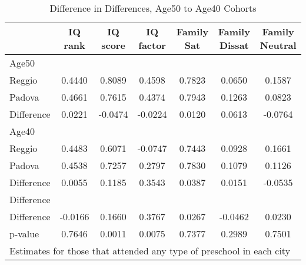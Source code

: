 \begin{table}[htbp]\centering
\caption{Difference in Differences, Age50 to Age40 Cohorts}
\begin{tabular}{l*{6}{c}}
\hline\hline
            &     IQ rank&    IQ score&   IQ factor&  Family Sat&Family Dissat&Family Neutral\\
\hline
Age50       &            &            &            &            &            &            \\
Reggio      &      0.4440&      0.8089&      0.4598&      0.7823&      0.0650&      0.1587\\
Padova      &      0.4661&      0.7615&      0.4374&      0.7943&      0.1263&      0.0823\\
Difference  &      0.0221&     -0.0474&     -0.0224&      0.0120&      0.0613&     -0.0764\\
\hline
Age40       &            &            &            &            &            &            \\
Reggio      &      0.4483&      0.6071&     -0.0747&      0.7443&      0.0928&      0.1661\\
Padova      &      0.4538&      0.7257&      0.2797&      0.7830&      0.1079&      0.1126\\
Difference  &      0.0055&      0.1185&      0.3543&      0.0387&      0.0151&     -0.0535\\
\hline
Difference  &            &            &            &            &            &            \\
Difference  &     -0.0166&      0.1660&      0.3767&      0.0267&     -0.0462&      0.0230\\
p-value     &      0.7646&      0.0011&      0.0075&      0.7377&      0.2989&      0.7501\\
\hline\hline
\multicolumn{7}{l}{\footnotesize Estimates for those that attended any type of preschool in each city}\\
\end{tabular}
\end{table}
